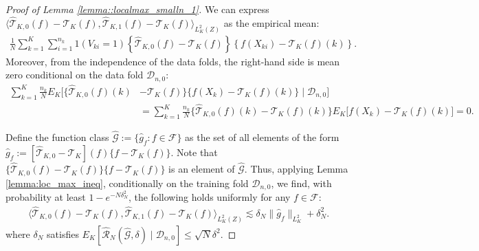 \documentclass[11pt]{article}
\theoremstyle{plain}
\theoremstyle{definition}
\theoremstyle{remark}
\theoremstyle{definition}
\begin{document}
 
 \begin{proof}[Proof of Lemma \ref{lemma::localmax_smalln_1}]

We can express \(\langle  \widehat{\mathcal{T}}_{K,0}(f) - \mathcal{T}_{K}(f), \widehat{\mathcal{T}}_{K,1}(f) - \mathcal{T}_{K}(f) \rangle_{L^2_K(Z)}\) as the empirical mean:
\begin{align*}
  \frac{1}{N} \sum_{k=1}^K \sum_{i=1}^{n_k} 1(V_{ki} = 1) \left\{\widehat{\mathcal{T}}_{K,0}(f) - \mathcal{T}_{K}(f)\right\} \left\{f(X_{ki}) - \mathcal{T}_{K}(f)(k) \right\}.
\end{align*}
Moreover, from the independence of the data folds, the right-hand side is mean zero conditional on the data fold $\mathcal{D}_{n,0}$:
\begin{align*}
\sum_{k=1}^K \frac{n_k}{N} E_K\Big[ \big\{\widehat{\mathcal{T}}_{K,0}(f)(k) &- \mathcal{T}_{K}(f)\big\}  \big\{f(X_{k}) - \mathcal{T}_{K}(f)(k) \big\} \mid \mathcal{D}_{n,0} \Big] \\
&= \sum_{k=1}^K \frac{n_k}{N} \big\{\widehat{\mathcal{T}}_{K,0}(f)(k) - \mathcal{T}_{K}(f)(k)\big\} E_K\big[f(X_{k}) - \mathcal{T}_{K}(f)(k) \big] = 0. 
\end{align*}

Define the function class $\widehat{\mathcal{G}} := \{\widehat{g}_f : f \in \mathcal{F}\}$ as the set of all elements of the form $ \widehat{g}_f :=[\widehat{\mathcal{T}}_{K,0} - \mathcal{T}_{K}](f) \{f - \mathcal{T}_{K}(f)\}$. Note that $ \big\{\widehat{\mathcal{T}}_{K,0}(f) - \mathcal{T}_{K}(f)\big\}  \big\{f - \mathcal{T}_{K}(f)\big\}$ is an element of $\widehat{\mathcal{G}} $. Thus, applying Lemma \ref{lemma:loc_max_ineq}, conditionally on the training fold $\mathcal{D}_{n,0}$, we find, with probability at least $1 - e^{-N\delta_N^2}$, the following holds uniformly for any $f \in \mathcal{F}$:
\begin{align*}
 \langle  \widehat{\mathcal{T}}_{K,0}(f) - \mathcal{T}_{K}(f), \widehat{\mathcal{T}}_{K,1}(f) - \mathcal{T}_{K}(f) \rangle_{L^2_K(Z)} \lesssim \delta_N \|\widehat{g}_f \|_{L^2_K} + \delta_N^2.
\end{align*}
where $\delta_N$ satisfies $E_K[\widehat{\mathcal{R}}_N(\widehat{\mathcal{G}}, \delta) \mid \mathcal{D}_{n,0}] \leq \sqrt{N} \delta^2$. 



\end{proof}
\end{document}

